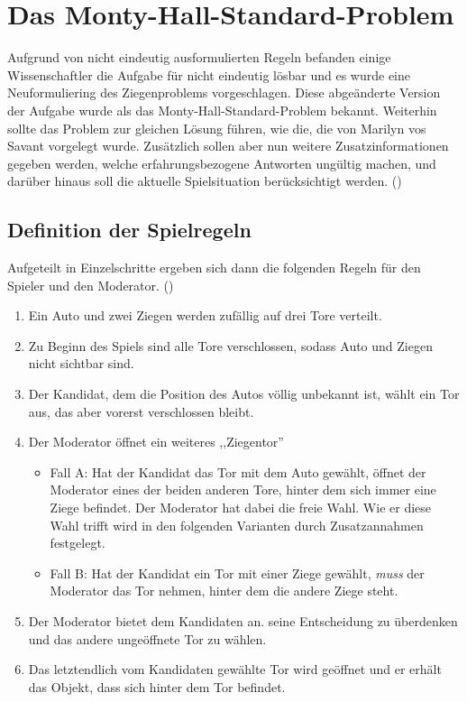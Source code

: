 
\chapter{Das Monty-Hall-Standard-Problem} \label{chap:monty-hall-standard}

Aufgrund von nicht eindeutig ausformulierten Regeln befanden einige Wissenschaftler die Aufgabe für nicht eindeutig lösbar und es wurde eine Neuformuliering des
Ziegenproblems vorgeschlagen. Diese abgeänderte Version der Aufgabe wurde als das Monty-Hall-Standard-Problem bekannt. Weiterhin sollte das Problem zur gleichen
Lösung führen, wie die, die von Marilyn vos Savant vorgelegt wurde. Zusätzlich sollen aber nun weitere Zusatzinformationen gegeben werden, welche erfahrungsbezogene Antworten ungültig
machen, und darüber hinaus soll die aktuelle Spielsituation berücksichtigt werden. (\cite{Mueser:1999})

\section{Definition der Spielregeln}

Aufgeteilt in Einzelschritte ergeben sich dann die folgenden Regeln für den Spieler und den Moderator. (\cite{Savant:2001})
\begin{enumerate}
    \item Ein Auto und zwei Ziegen werden zufällig auf drei Tore verteilt.
    \item Zu Beginn des Spiels sind alle Tore verschlossen, sodass Auto und Ziegen nicht sichtbar sind.
    \item Der Kandidat, dem die Position des Autos völlig unbekannt ist, wählt ein Tor aus, das aber vorerst verschlossen bleibt.
    \item Der Moderator öffnet ein weiteres ,,Ziegentor''\begin{itemize}
              \item Fall A: Hat der Kandidat das Tor mit dem Auto gewählt, öffnet der Moderator eines der beiden anderen Tore, hinter dem sich immer eine Ziege befindet.
                    Der Moderator hat dabei die freie Wahl. Wie er diese Wahl trifft wird in den folgenden Varianten durch Zusatzannahmen festgelegt.
              \item Fall B: Hat der Kandidat ein Tor mit einer Ziege gewählt, \textit{muss} der Moderator das Tor nehmen, hinter dem die andere Ziege steht.
          \end{itemize}
    \item Der Moderator bietet dem Kandidaten an. seine Entscheidung zu überdenken und das andere ungeöffnete Tor zu wählen.
    \item Das letztendlich vom Kandidaten gewählte Tor wird geöffnet und er erhält das Objekt, dass sich hinter dem Tor befindet.
\end{enumerate}

